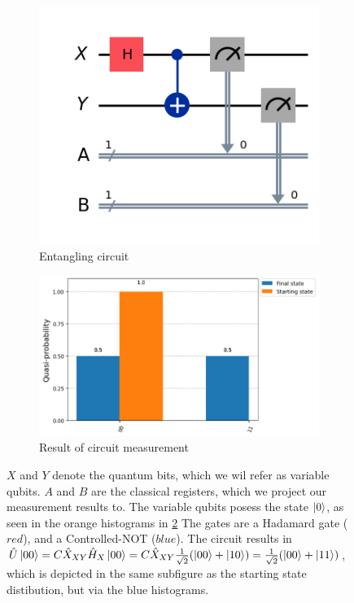 \documentclass[encoding=utf8,british]{tumphthesis}
\begin{document}
        \begin{figure}[ht]
        \centering
        \begin{subfigure}{.5\textwidth}
        \centering
        \includegraphics[width=0.85\linewidth]{pics/entangling.png}
        \caption{Entangling circuit}
        \label{fig:Entangling_circuit_A}
        \end{subfigure}%
        \begin{subfigure}{.5\textwidth}
        \centering
        \includegraphics[width=1\linewidth]{pics/entangling_results.png}
        \caption{Result of circuit measurement}
        \label{fig:Entangling_circuit_B}
        \end{subfigure}
        \caption{$X$ and $Y$ denote the quantum bits, which we wil refer as variable qubits. 
        $A$ and $B$ are the classical registers, which we project our measurement results to. 
        The variable qubits posess the state $\left|0\right>$, as seen in the orange histograms in \ref{fig:Entangling_circuit_B} 
        The gates are a Hadamard gate ($red$), and a Controlled-NOT ($blue$). The circuit results in $\hat{U}\left|00\right> = C\hat{X}_{XY}\hat{H}_X\left|00\right> = 
        C\hat{X}_{XY}\frac{1}{\sqrt{2}}(\left|00\right> + \left|10\right>) = \frac{1}{\sqrt{2}}(\left|00\right> + \left|11\right>)$, which is depicted in the same subfigure as the starting state distibution, but 
        via the blue histograms.}
        \label{fig:Entangling_circuit}
        \end{figure}
\end{document}
